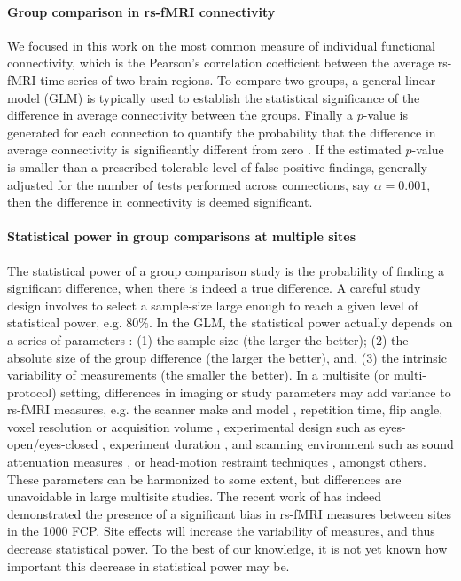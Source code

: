 \documentclass[authoryear]{elsarticle}
\begin{document}
\paragraph{Group comparison in rs-fMRI connectivity}
We focused in this work on the most common measure of individual functional connectivity, which is the Pearson's correlation coefficient between the average rs-fMRI time series of two brain regions. To compare two groups, a general linear model (GLM) is typically used to establish the statistical significance of the difference in average connectivity between the groups. Finally a $p$-value is generated for each connection to quantify the probability that the difference in average connectivity is significantly different from zero \citep{Worsley1995}. If the estimated $p$-value is smaller than a prescribed tolerable level of false-positive findings, generally adjusted for the number of tests performed across connections, say $\alpha=0.001$, then the difference in connectivity is deemed significant. 

\paragraph{Statistical power in group comparisons at multiple sites}
The statistical power of a group comparison study is the probability of finding
a significant difference, when there is indeed a true difference. A careful
study design involves to select a sample-size large enough to reach a given
level of statistical power, e.g. $80\%$. In the GLM, the statistical power
actually depends on a series of parameters \citep{Desmond2002}: (1) the sample
size (the larger the better); (2) the absolute size of the group difference (the
larger the better), and, (3) the intrinsic variability of measurements (the
smaller the better).
In a multisite (or multi-protocol) setting, differences in imaging or study parameters may add variance to rs-fMRI measures, e.g. the scanner make and model \citep{Friedman2006}, repetition time, flip angle, voxel resolution or acquisition volume \citep{Friedman2006a}, experimental design such as eyes-open/eyes-closed \citep{Yan2009}, experiment duration \citep{VanDijk2010}, and scanning environment such as sound attenuation measures \citep{Elliott1999}, or head-motion restraint techniques \citep{Edward2000,VanDijk2012}, amongst others. These parameters can be harmonized to some extent, but differences are unavoidable in large multisite studies. The recent work of \cite{Yan2013h} has indeed demonstrated the presence of a significant bias in rs-fMRI measures between sites in the 1000 FCP. Site effects will increase the variability of measures, and thus decrease statistical power. To the best of our knowledge, it is not yet known how important this decrease in statistical power may be. 
\end{document}
